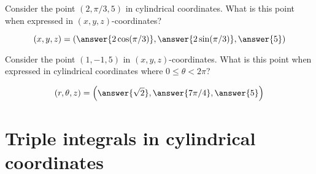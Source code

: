 \documentclass{ximera}
\begin{document}
\begin{question}
  Consider the point $(2, \pi/3,5)$ in cylindrical coordinates. What is
  this point when expressed in $(x,y,z)$-coordinates?
  \begin{prompt}
    \[
    (x,y,z) = \left(\answer{2\cos(\pi/3)}, \answer{2 \sin(\pi/3)},\answer{5}\right)
    \]
  \end{prompt}
  \begin{question}
    Consider the point $(1, -1,5)$ in $(x,y,z)$-coordinates. What is
    this point when expressed in cylindrical coordinates where
    $0\le\theta<2\pi$?
    \begin{prompt}
      \[
      (r,\theta,z) = \left(\answer{\sqrt{2}}, \answer{7\pi/4},\answer{5}\right)
      \]
    \end{prompt}
  \end{question}
\end{question}

\section{Triple integrals in cylindrical coordinates}
\end{document}
